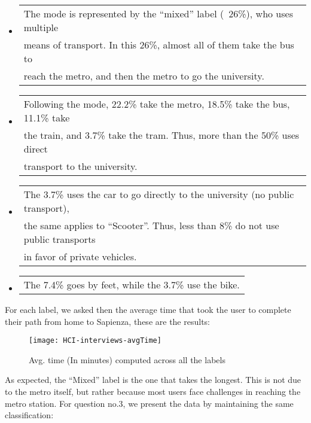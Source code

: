 \documentclass{article}
\begin{document}
\begin{itemize}
  \item \begin{tabular}[t]{@{}l@{}}
          The mode is represented by the “mixed” label (~26\%), who uses multiple \\
          means of transport. In this 26\%, almost all of them take the bus to \\
          reach the metro, and then the metro to go the university. 
        \end{tabular}
        
  \item \begin{tabular}[t]{@{}l@{}}
          Following the mode, 22.2\% take the metro, 18.5\% take the bus, 11.1\% take \\ the train, and 3.7\% take the tram. Thus, more than the 50\% uses direct \\ transport to the university.
        \end{tabular}
        
    \item \begin{tabular}[t]{@{}l@{}}
         The 3.7\% uses the car to go directly to the university (no public transport), \\ the same applies to “Scooter”. Thus, less than 8\% do not use public transports \\ in favor of private vehicles.
          \end{tabular}
          
    \item \begin{tabular}[t]{@{}l@{}}
         The 7.4\% goes by feet, while the 3.7\% use the bike.
         \end{tabular}
\end{itemize}
\newpage

For each label, we asked then the average time that took the user to complete their path from home to Sapienza, these are the results:

\begin{figure}[htbp]
  \centering
    \texttt{[image: HCI-interviews-avgTime]}
    \caption{Avg. time (In minutes) computed across all the labels}
\end{figure}

As expected, the “Mixed” label is the one that takes the longest. This is not due to the metro itself, but rather because most users face challenges in reaching the metro station. \newline
For question no.3, we present the data by maintaining the same classification:
\end{document}
